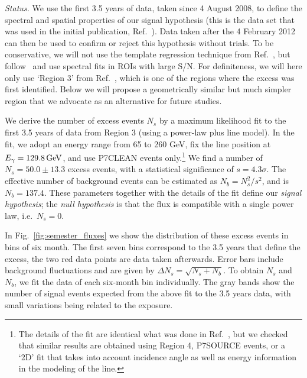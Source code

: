 \documentclass[aps,prd,superscriptaddress,nofootinbib,fixlfloat, 12pt]{revtex4-1}
\begin{document}
\emph{Status.} 
We use the first 3.5 years of data, taken since 4 August 2008, to
define the spectral and spatial properties of our signal hypothesis (this is
the data set that was used in the initial publication,
Ref.~\cite{Bringmann:2012}). Data taken after the 4 February 2012 can then be
used to confirm or reject this hypothesis without trials. To be conservative,
we will not use the template regression technique from Ref.~\cite{linepaper},
but follow~\cite{Bringmann:2012, Weniger:2012} and use spectral fits in ROIs
with large S/N.  For definiteness, we will here only use `Region 3' from
Ref.~\cite{Weniger:2012}, which is one of the regions where the excess was
first identified. Below we will
propose a geometrically similar but much simpler region that we advocate as an
alternative for future studies.

We derive the number of excess events $N_s$ by a maximum likelihood fit to the
first 3.5 years of data from Region 3 (using a power-law plus line model). In
the fit, we adopt an energy range from 65 to 260 GeV, fix the line position at
$E_\gamma=129.8\rm\,GeV$, and use P7CLEAN events only.\footnote{The details of
the fit are identical what was done in Ref.~\cite{Weniger:2012}, but we
checked that similar results are obtained using Region 4, P7SOURCE events,
or a `2D' fit that takes into account incidence angle as well as energy
information in the modeling of the line.} We find a number of $N_s=50.0\pm 13.3$
excess events, with a
statistical significance of $s=4.3\sigma$. The effective number
of background events can be estimated as $N_b = N_s^2/s^2$, and is $N_b=137.4$.
These parameters together with the details of the fit define our \emph{signal
hypothesis}; the \emph{null hypothesis} is that the flux is compatible with a
single power law, i.e.~$N_s=0$.

In Fig.~\ref{fig:semester_fluxes} we show the distribution of these excess events in bins of six
month. The first seven bins correspond to the 3.5 years that define the
excess, the two red data points are data taken afterwards. Error bars include
background fluctuations and are given by $\Delta N_s = \sqrt{N_s+N_b}$. To
obtain $N_s$ and $N_b$, we fit the data of each six-month bin
individually. The gray bands show the number of signal events expected from
the above fit to the 3.5 years data, with small variations being related to
the exposure.
\end{document}
